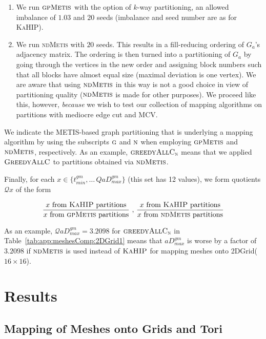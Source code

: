\documentclass[pdftex]{llncs}
\newcommand{\metis}{\textsc{METIS}\xspace}
\newcommand{\gpmetis}{\textsc{gpMetis}\xspace}
\newcommand{\ndmetis}{\textsc{ndMetis}\xspace}
\newcommand{\kahip}{\textsc{KaHIP}\xspace}
\newcommand{\greedyallc}{\textsc{GreedyAllC}\xspace}
\newcommand{\greedyallcMO}{\textsc{greedyAllC}_{\textsc{n}} \xspace}
\begin{document}
\begin{enumerate}
\item We run $\gpmetis$ with the option of $k$-way partitioning, an
  allowed imbalance of $1.03$ and $20$ seeds (imbalance and 
  seed number are as for \kahip).
\item We run \ndmetis with $20$ seeds. This results in a fill-reducing
  ordering of $G_a$'s adjacency matrix. The ordering is then turned
  into a partitioning of $G_a$ by going through the vertices in the
  new order and assigning block numbers such that all blocks have
  almost equal size (maximal deviation is one vertex). We are aware
  that using $\ndmetis$ in this way is not a good choice in view of
  partitioning quality ($\ndmetis$ is made for other purposes). We
  proceed like this, however, \emph{because} we wish to test our
  collection of mapping algorithms on partitions with mediocre edge cut
  and MCV.
\end{enumerate}

We indicate the \metis-based graph partitioning that is underlying a
mapping algorithm by using the subscripts $\textsc{g}$ and
$\textsc{n}$ when employing $\gpmetis$ and $\ndmetis$,
respectively. As an example, $\greedyallcMO$ means that we applied
$\greedyallc$ to partitions obtained via $\ndmetis$.

Finally, for each $x \in \{t^{gm}_{min}, \dots\, QaD^{gm}_{max}\}$
(this set has 12 values), we form quotients $\mathcal{Q}x$ of the form

\begin{equation*}
\frac{\mbox{$x$ from \kahip partitions}}{\mbox{$x$ from \gpmetis
    partitions}} \mbox{~,~} \frac{\mbox{$x$ from \kahip
    partitions}}{\mbox{$x$ from \ndmetis partitions}}
\end{equation*}

As an example, $\mathcal{Q}aD^{gm}_{max} = 3.2098$ for $\greedyallcMO$
in Table~\ref{tab:app:meshesComp:2DGrid1} means that $aD^{gm}_{max}$
is worse by a factor of $3.2098$ if $\ndmetis$ is used instead of
$\kahip$ for mapping meshes onto 2DGrid($16 \times 16$).

\section{Results}
\label{sec:results}
\subsection{Mapping of Meshes onto Grids and Tori}
\label{sub:exp-grids-tori-meshes}
\end{document}
